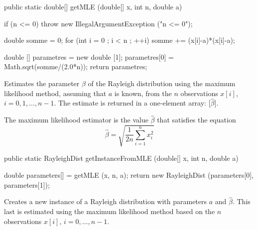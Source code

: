 \begin{code}

   public static double[] getMLE (double[] x, int n, double a)\begin{hide} {
      if (n <= 0)
         throw new IllegalArgumentException ("n <= 0");

      double somme = 0;
      for (int i = 0 ; i < n ; ++i) somme += (x[i]-a)*(x[i]-a);

      double [] parametres = new double [1];
      parametres[0] = Math.sqrt(somme/(2.0*n));
      return parametres;
   }\end{hide}
\end{code}
\begin{tabb}
   Estimates the parameter $\beta$ of the Rayleigh distribution
   using the maximum likelihood method, assuming that $a$ is known,
   from the $n$ observations $x[i]$, $i = 0, 1, \ldots, n-1$.
   The estimate is returned in a one-element array: [$\hat\beta$].
   \begin{detailed}
   The maximum likelihood estimator is the value
   $\hat{\beta}$ that satisfies the equation
  $$
      \hat{\beta}  = \sqrt{\frac1{2n}\sum_{i=1}^{n} x_i^2}
  $$
   \end{detailed}
\end{tabb}
\begin{htmlonly}
\end{htmlonly}
\begin{code}

   public static RayleighDist getInstanceFromMLE (double[] x, int n,
                                                  double a)\begin{hide} {
      double parameters[] = getMLE (x, n, a);
      return new RayleighDist (parameters[0], parameters[1]);
   }\end{hide}
\end{code}
\begin{tabb}
   Creates a new instance of a Rayleigh distribution with parameters $a$ and
   $\hat\beta$. This last is estimated using the maximum likelihood method
   based on the $n$ observations $x[i]$, $i = 0, \ldots, n-1$.
\end{tabb}
\begin{htmlonly}
\end{htmlonly}
